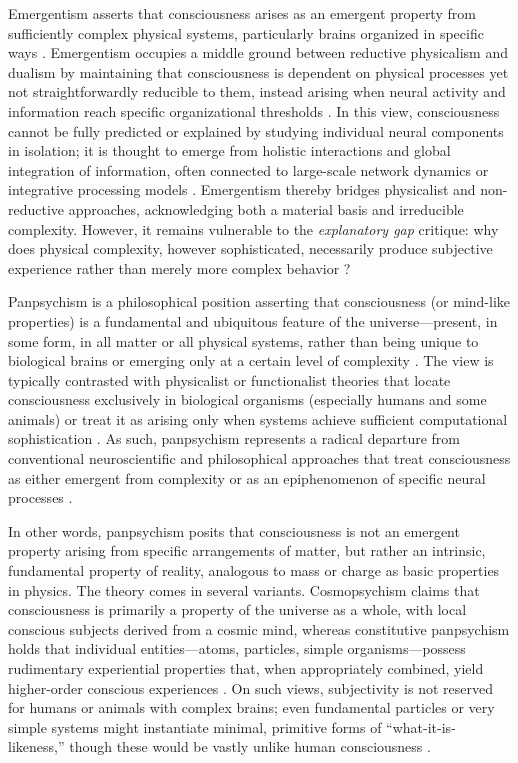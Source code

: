 Emergentism asserts that consciousness arises as an emergent property from sufficiently complex physical systems, particularly brains organized in specific ways \cite{chalmers2000conscious,francken2022consciousness}. Emergentism occupies a middle ground between reductive physicalism and dualism by maintaining that consciousness is dependent on physical processes yet not straightforwardly reducible to them, instead arising when neural activity and information reach specific organizational thresholds \cite{chalmers2000conscious}. In this view, consciousness cannot be fully predicted or explained by studying individual neural components in isolation; it is thought to emerge from holistic interactions and global integration of information, often connected to large-scale network dynamics or integrative processing models \cite{francken2022consciousness,tononi2016integrated}. Emergentism thereby bridges physicalist and non-reductive approaches, acknowledging both a material basis and irreducible complexity. However, it remains vulnerable to the \emph{explanatory gap} critique: why does physical complexity, however sophisticated, necessarily produce subjective experience rather than merely more complex behavior \cite{chalmers1995facing,francken2022consciousness,levine1983materialism}?

Panpsychism is a philosophical position asserting that consciousness (or mind-like properties) is a fundamental and ubiquitous feature of the universe---present, in some form, in all matter or all physical systems, rather than being unique to biological brains or emerging only at a certain level of complexity \cite{chalmers2016combination,strawson2008realistic}. The view is typically contrasted with physicalist or functionalist theories that locate consciousness exclusively in biological organisms (especially humans and some animals) or treat it as arising only when systems achieve sufficient computational sophistication \cite{reggia2013rise}. As such, panpsychism represents a radical departure from conventional neuroscientific and philosophical approaches that treat consciousness as either emergent from complexity or as an epiphenomenon of specific neural processes \cite{chalmers2016combination,francken2022consciousness}.

In other words, panpsychism posits that consciousness is not an emergent property arising from specific arrangements of matter, but rather an intrinsic, fundamental property of reality, analogous to mass or charge as basic properties in physics. The theory comes in several variants. Cosmopsychism claims that consciousness is primarily a property of the universe as a whole, with local conscious subjects derived from a cosmic mind, whereas constitutive panpsychism holds that individual entities---atoms, particles, simple organisms---possess rudimentary experiential properties that, when appropriately combined, yield higher-order conscious experiences \cite{chalmers2016combination}. On such views, subjectivity is not reserved for humans or animals with complex brains; even fundamental particles or very simple systems might instantiate minimal, primitive forms of ``what-it-is-likeness,'' though these would be vastly unlike human consciousness \cite{strawson2008realistic}.

